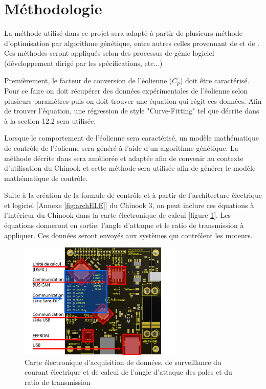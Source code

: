 \documentclass[11pt]{article}
\begin{document}
\section{Méthodologie}

La méthode utilisé dans ce projet sera adapté à partir de plusieurs méthode d'optimisation par algorithme génétique, entre autres celles provennant de \cite{GeneticField} et de \cite{Ouissam12}. Ces méthodes seront appliqués selon des processus de génie logiciel (développement dirigé par les spécifications, etc...)

Premièrement, le facteur de conversion de l'éolienne ($C_p$) doit être caractérisé. Pour ce faire on doit récupérer des données expérimentales de l'éolienne selon plusieurs paramètres puis on doit trouver une équation qui régit ces données. Afin de trouver l'équation, une régression de style "Curve-Fitting" tel que décrite dans \cite{GeneticField} à la section 12.2 sera utilisée.

Lorsque le comportement de l'éolienne sera caractérisé, un modèle mathématique de contrôle de l'éolienne sera généré à l'aide d'un algorithme génétique. La méthode décrite dans \cite{Ouissam12} sera améliorée et adaptée afin de convenir au contexte d'utilisation du Chinook et cette méthode sera utilisée afin de générer le modèle mathématique de contrôle.

Suite à la création de la formule de contrôle et à partir de l'architecture électrique et logiciel [Annexe \ref{fig:archELE}] du Chinook 3, on peut inclure ces équations à l'intérieur du Chinook dans la carte électronique de calcul [figure \ref{fig:carteElec}]. Les équations donneront en sortie: l'angle d'attaque et le ratio de transmission à appliquer. Ces données seront envoyés aux systèmes qui contrôlent les moteurs.

\begin{figure}[H]
  \centering
  \includegraphics[width=0.7\textwidth]{images/3d-top-annoté.pdf}
  \caption[Carte électronique de calcul]{Carte électronique d'acquisition de données, de surveillance du courant électrique et de calcul de l'angle d'attaque des pales et du ratio de transmission}
  \label{fig:carteElec}
\end{figure}
\end{document}

